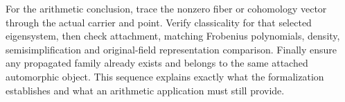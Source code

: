 \documentclass[11pt]{article}
\begin{document}
For the arithmetic conclusion, trace the nonzero fiber or cohomology vector through the actual carrier and point. Verify classicality for that selected eigensystem, then check attachment, matching Frobenius polynomials, density, semisimplification and original-field representation comparison. Finally ensure any propagated family already exists and belongs to the same attached automorphic object. This sequence explains exactly what the formalization establishes and what an arithmetic application must still provide.
\end{document}
